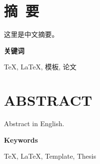 \newpage
\chapter*{摘\ 要}

这里是中文摘要。

\vspace{8mm}

\noindent \textbf{\Large{关键词}}

\noindent \TeX, \LaTeX, 模板, 论文

\newpage
\chapter*{ABSTRACT}

Abstract in English.

\vspace{8mm}

\noindent \textbf{\Large{Keywords}}

\noindent \TeX, \LaTeX, Template, Thesis